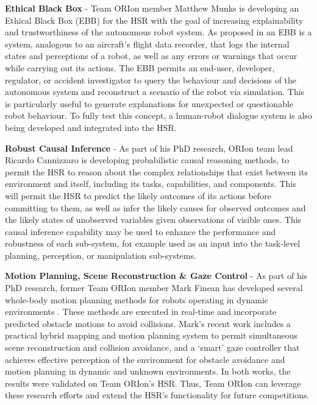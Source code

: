 \documentclass[runningheads,a4paper]{llncs}
\newcommand{\teamori}{Team ORIon}
\begin{document}
\textbf{Ethical Black Box} - \teamori{} member Matthew Munks is developing an Ethical Black Box (EBB) for the HSR with the goal of increasing explainability and trustworthiness of the autonomous robot system. As proposed in \cite{winfield2017} an EBB is a system, analogous to an aircraft's flight data recorder, that logs the internal states and perceptions of a robot, as well as any errors or warnings that occur while carrying out its actions. The EBB permits an end-user, developer, regulator, or accident investigator to query the behaviour and decisions of the autonomous system and reconstruct a scenario of the robot via simulation. This is particularly useful to generate explanations for unexpected or questionable robot behaviour. To fully test this concept, a human-robot dialogue system is also being developed and integrated into the HSR.

\textbf{Robust Causal Inference} - As part of his PhD research, ORIon team lead Ricardo Cannizzaro is developing probabilistic causal reasoning methods, to permit the HSR to reason about the complex relationships that exist between its environment and itself, including its tasks, capabilities, and components. This will permit the HSR to predict the likely outcomes of its actions before committing to them, as well as infer the likely causes for observed outcomes and the likely states of unobserved variables given observations of visible ones. This causal inference capability may be used to enhance the performance and robustness of each sub-system, for example used as an input into the task-level planning, perception, or manipulation sub-systems.

\textbf{Motion Planning, Scene Reconstruction \& Gaze Control} - As part of his PhD research, former \teamori{} member Mark Finean has developed several whole-body motion planning methods for robots operating in dynamic environments \cite{finean2021predicted,finean2021simultaneous,finean2021i}. These methods are executed in real-time and incorporate predicted obstacle motions to avoid collisions. Mark's recent work includes a practical hybrid mapping and motion planning system to permit simultaneous scene reconstruction and collision avoidance, and a `smart' gaze controller that achieves effective perception of the environment for obstacle avoidance and motion planning in dynamic and unknown environments. In both works, the results were validated on \teamori{}'s HSR. Thus, \teamori{} can leverage these research efforts and extend the HSR's functionality for future competitions.
\end{document}
